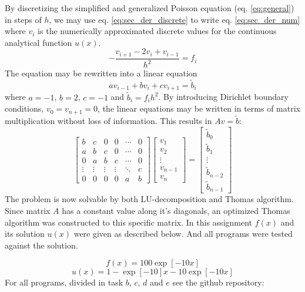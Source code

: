 \documentclass[twoside,twocolumn]{article}
\begin{document}
By discretizing the simplified and generalized Poisson equation (eq. \ref{eq:general}) in steps of $h$, we may use eq. \ref{eq:sec_der_discrete} to write eq. \ref{eq:sec_der_num} where $v_i$ is the numerically approximated discrete values for the continuous analytical function $u(x)$.
\begin{equation}
-\frac{v_{i+1}-2v_i+v_{i-1}}{h^2}=f_i \label{eq:sec_der_num}
\end{equation}
The equation may be rewritten into a linear equation
\begin{equation*}
av_{i-1}+bv_i+cv_{i+1}=\tilde{b}_i 
\end{equation*}
where $a=-1$, $b=2$, $c=-1$ and $\tilde{b}_i=f_ih^2$. By introducing Dirichlet boundary conditions, $v_0=v_{n+1}=0$, the linear equations may be written in terms of matrix multiplication without loss of information. This results in $Av=\tilde{b}$:
\begin{equation}
\begin{bmatrix}
b&c&0&0&\cdots &0\\
a&b&c&0& \cdots & 0\\
0&a&b&c& \cdots & 0\\
\vdots&\vdots&\vdots&\vdots&\ddots&c\\
0&0&0&0&a&b
\end{bmatrix}
\begin{bmatrix}
v_1\\v_2\\\vdots\\v_{n-1}\\v_{n}
\end{bmatrix}=
\begin{bmatrix}
\tilde{b}_0\\\tilde{b}_1\\\vdots\\\tilde{b}_{n-2}\\\tilde{b}_{n-1}
\end{bmatrix} \label{eq:problem}
\end{equation}
The problem is now solvable by both LU-decomposition and Thomas algorithm. Since matrix $A$ has a constant value along it's diagonals, an optimized Thomas algorithm was constructed to this specific matrix.
In this assignment $f(x)$ and its solution $u(x)$ were given as described below. And all programs were tested against the solution.

\begin{equation*}
f(x)=100\exp[-10x]
\end{equation*}
\begin{equation*}
u(x)=1-\exp[-10]x-10\exp[-10x]
\end{equation*}
For all programs, divided in task $b$, $c$, $d$ and $e$ see the github repository: 
\end{document}
